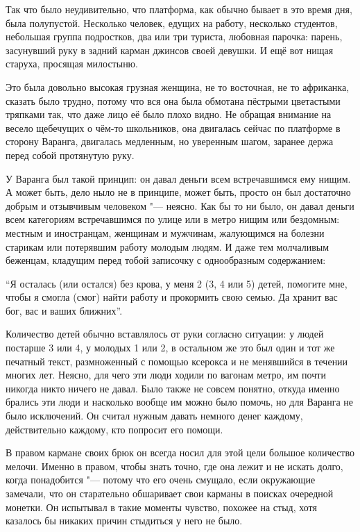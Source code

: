 Так что было неудивительно, что платформа, как обычно бывает в это время дня,
была полупустой.
Несколько человек, едущих на работу, несколько студентов, небольшая группа
подростков, два или три туриста, любовная парочка: парень, засунувший руку в
задний карман джинсов своей девушки.
И ещё вот нищая старуха, просящая милостыню.

Это была довольно высокая грузная женщина, не то восточная, не то африканка,
сказать было трудно, потому что вся она была обмотана пёстрыми цветастыми
тряпками так, что даже лицо её было плохо видно.
Не обращая внимание на весело щебечущих о чём-то школьников, она двигалась
сейчас по платформе в сторону Варанга, двигалась медленным, но уверенным шагом,
заранее держа перед собой протянутую руку.

У Варанга был такой принцип: он давал деньги всем встречавшимся ему нищим.
А может быть, дело ныло не в принципе, может быть, просто он был достаточно
добрым и отзывчивым человеком "--- неясно.
Как бы то ни было, он давал деньги всем категориям встречавшимся по улице или в
метро нищим или бездомным: местным и иностранцам, женщинам и мужчинам,
жалующимся на болезни старикам или потерявшим работу молодым людям.
И даже тем молчаливым беженцам, кладущим перед тобой записочку с однообразным
содержанием:

\enquote{Я осталась (или остался) без крова, у меня 2 (3, 4 или 5) детей,
помогите мне, чтобы я смогла (смог) найти работу и прокормить свою семью.
Да хранит вас бог, вас и ваших ближних}.

Количество детей обычно вставлялось от руки согласно ситуации:
у людей постарше 3 или 4, у молодых 1 или 2, в остальном же это был один и тот
же печатный текст, размноженный с помощью ксерокса и не менявшийся в течении
многих лет.
Неясно, для чего эти люди ходили по вагонам метро, им почти никогда никто ничего
не давал.
Было также не совсем понятно, откуда именно брались эти люди и насколько вообще
им можно было помочь, но для Варанга не было исключений.
Он считал нужным давать немного денег каждому, действительно каждому, кто
попросит его помощи.

В правом кармане своих брюк он всегда носил для этой цели большое количество
мелочи.
Именно в правом, чтобы знать точно, где она лежит и не искать долго, когда
понадобится "--- потому что его очень смущало, если окружающие замечали, что он
старательно обшаривает свои карманы в поисках очередной монетки.
Он испытывал в такие моменты чувство, похожее на стыд, хотя казалось бы никаких
причин стыдиться у него не было.


